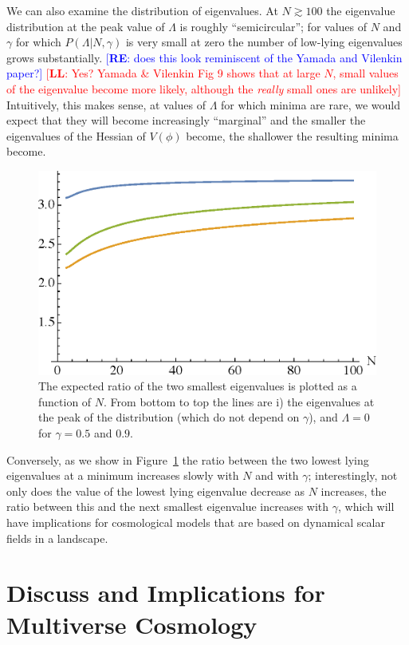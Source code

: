 \documentclass[12pt]{article}
\newcommand{\re}[1]{\textcolor{blue}{[{\bf RE}: #1]}}
\newcommand{\lfl}[1]{\textcolor{red}{[{\bf LL}: #1]}}
\begin{document}
We can also examine the distribution of eigenvalues. At  $N\gtrsim 100$ the eigenvalue distribution at the peak value of $\Lambda$ is roughly ``semicircular''; for values of $N$ and $\gamma$ for which $P(\Lambda|N,\gamma)$ is very small at zero the number of low-lying eigenvalues grows substantially. \re{does this look reminiscent of the Yamada and Vilenkin paper?} \lfl{Yes? Yamada \& Vilenkin Fig 9 shows that at large $N$, small values of the eigenvalue become more likely, although the \emph{really} small ones are unlikely} Intuitively, this makes sense, at values of $\Lambda$ for which minima are rare, we would expect that they will become increasingly ``marginal'' and the smaller the eigenvalues of the Hessian of $V(\phi)$ become, the shallower the resulting minima become. 

\begin{figure} 
  \centering
  \includegraphics[width=.6\linewidth]{ratio.eps}  
  \caption{The expected ratio of the two smallest eigenvalues is plotted as a function of $N$.   From bottom to top the lines are i) the eigenvalues at the peak  of the distribution (which do not depend on $\gamma$), and $\Lambda=0$ for $\gamma =0.5$ and $0.9$.}
  \label{ratio}
\end{figure}

Conversely, as we show in Figure~\ref{ratio} the ratio between the two lowest lying eigenvalues at a minimum increases slowly with $N$ and with $\gamma$; interestingly, not only does the value of the lowest lying eigenvalue decrease as  $N$ increases, the ratio between this and the next smallest eigenvalue increases with $\gamma$, which will have implications for cosmological models that are based on dynamical scalar fields in a landscape. 





 
\section{Discuss and Implications for Multiverse Cosmology}
\end{document}
